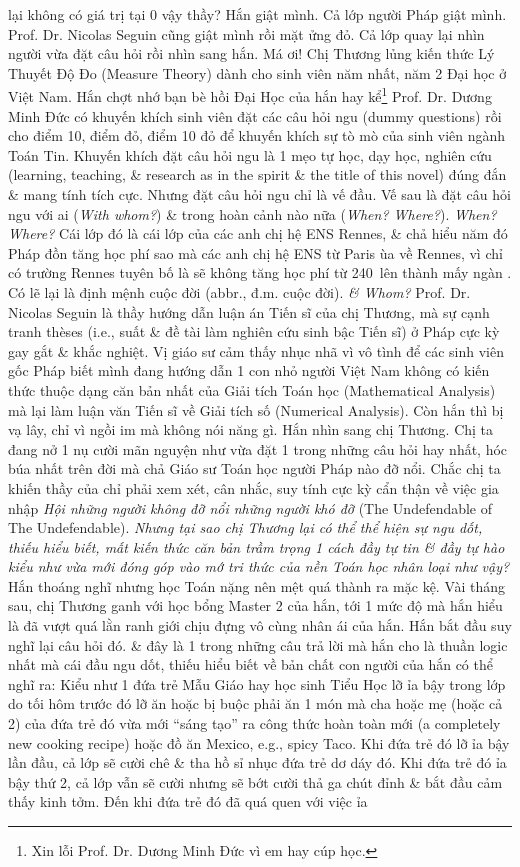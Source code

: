 \documentclass[12pt,twoside]{book}
\begin{document}
lại không có giá trị tại $0$ vậy thầy? Hắn giật mình. Cả lớp người Pháp giật mình. Prof. Dr. {\sc Nicolas Seguin} cũng giật mình rồi mặt ửng đỏ. Cả lớp quay lại nhìn người vừa đặt câu hỏi rồi nhìn sang hắn. Má ơi! Chị Thương lủng kiến thức Lý Thuyết Độ Đo (Measure Theory) dành cho sinh viên năm nhất, năm 2 Đại học ở Việt Nam. Hắn chợt nhớ bạn bè hồi Đại Học của hắn hay kể\footnote{Xin lỗi Prof. Dr. {\sc Dương Minh Đức} vì em hay cúp học.} Prof. Dr. {\sc Dương Minh Đức} có khuyến khích sinh viên đặt các câu hỏi ngu (dummy questions) rồi cho điểm 10, điểm đỏ, điểm 10 đỏ để khuyến khích sự tò mò của sinh viên ngành Toán Tin. Khuyến khích đặt câu hỏi ngu là 1 mẹo tự học, dạy học, nghiên cứu (learning, teaching, \& research as in the spirit \& the title of this novel) đúng đắn \& mang tính tích cực. Nhưng đặt câu hỏi ngu chỉ là vế đầu. Vế sau là đặt câu hỏi ngu với ai ({\it With whom?}) \& trong hoàn cảnh nào nữa ({\it When? Where?}). {\it When? Where?} Cái lớp đó là cái lớp của các anh chị hệ ENS Rennes, \& chả hiểu năm đó Pháp đồn tăng học phí sao mà các anh chị hệ ENS từ Paris ùa về Rennes, vì chỉ có trường Rennes tuyên bố là sẽ không tăng học phí từ 240\texteuro\ lên thành mấy ngàn \texteuro. Có lẽ lại là định mệnh cuộc đời (abbr., đ.m. cuộc đời). {\it\& Whom?} Prof. Dr. {\sc Nicolas Seguin} là thầy hướng dẫn luận án Tiến sĩ của chị Thương, mà sự cạnh tranh th\`eses (i.e., suất \& đề tài làm nghiên cứu sinh bậc Tiến sĩ) ở Pháp cực kỳ gay gắt \& khắc nghiệt. Vị giáo sư cảm thấy nhục nhã vì vô tình để các sinh viên gốc Pháp biết mình đang hướng dẫn 1 con nhỏ người Việt Nam không có kiến thức thuộc dạng căn bản nhất của Giải tích Toán học (Mathematical Analysis) mà lại làm luận văn Tiến sĩ về Giải tích số (Numerical Analysis). Còn hắn thì bị vạ lây, chỉ vì ngồi im mà không nói năng gì. Hắn nhìn sang chị Thương. Chị ta đang nở 1 nụ cười mãn nguyện như vừa đặt 1 trong những câu hỏi hay nhất, hóc búa nhất trên đời mà chả Giáo sư Toán học người Pháp nào đỡ nổi. Chắc chị ta khiến thầy của chỉ phải xem xét, cân nhắc, suy tính cực kỳ cẩn thận về việc gia nhập {\it Hội những người không đỡ nổi những người khó đỡ} (The Undefendable of The Undefendable). {\it Nhưng tại sao chị Thương lại có thể thể hiện sự ngu dốt, thiếu hiểu biết, mất kiến thức căn bản trầm trọng 1 cách đầy tự tin \& đầy tự hào kiểu như vừa mới đóng góp vào mớ tri thức của nền Toán học nhân loại như vậy?} Hắn thoáng nghĩ nhưng học Toán nặng nên mệt quá thành ra mặc kệ. Vài tháng sau, chị Thương ganh với học bổng Master 2 của hắn, tới 1 mức độ mà hắn hiểu là đã vượt quá lằn ranh giới chịu đựng vô cùng nhân ái của hắn. Hắn bắt đầu suy nghĩ lại câu hỏi đó. \& đây là 1 trong những câu trả lời mà hắn cho là thuần logic nhất mà cái đầu ngu dốt, thiếu hiểu biết về bản chất con người của hắn có thể nghĩ ra: Kiểu như 1 đứa trẻ Mẫu Giáo hay học sinh Tiểu Học lỡ ỉa bậy trong lớp do tối hôm trước đó lỡ ăn hoặc bị buộc phải ăn 1 món mà cha hoặc mẹ (hoặc cả 2) của đứa trẻ đó vừa mới ``sáng tạo'' ra công thức hoàn toàn mới (a completely new cooking recipe) hoặc đồ ăn Mexico, e.g., spicy Taco. Khi đứa trẻ đó lỡ ỉa bậy lần đầu, cả lớp sẽ cười chê \& tha hồ sỉ nhục đứa trẻ dơ dáy đó. Khi đứa trẻ đó ỉa bậy thứ 2, cả lớp vẫn sẽ cười nhưng sẽ bớt cười thả ga chút đỉnh \& bắt đầu cảm thấy kinh tởm. Đến khi đứa trẻ đó đã quá quen với việc ỉa 
\end{document}
